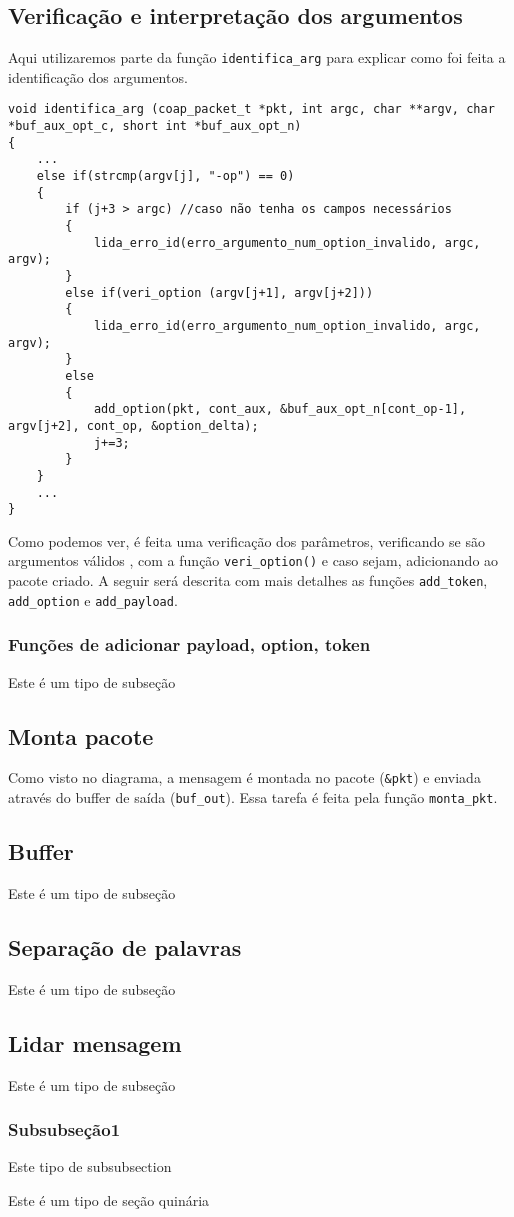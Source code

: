 \subsection{Verificação e interpretação dos argumentos}

Aqui utilizaremos parte da função \texttt{identifica\_arg} para explicar como foi feita a identificação dos argumentos.
\begin{lstlisting}
void identifica_arg (coap_packet_t *pkt, int argc, char **argv, char *buf_aux_opt_c, short int *buf_aux_opt_n)
{
	...
	else if(strcmp(argv[j], "-op") == 0)
	{
		if (j+3 > argc) //caso não tenha os campos necessários
		{
			lida_erro_id(erro_argumento_num_option_invalido, argc, argv);
		}
		else if(veri_option (argv[j+1], argv[j+2]))
		{
			lida_erro_id(erro_argumento_num_option_invalido, argc, argv);
		}
		else
		{
			add_option(pkt, cont_aux, &buf_aux_opt_n[cont_op-1], argv[j+2], cont_op, &option_delta);
			j+=3;
		}
	}
	...
}
\end{lstlisting}

Como podemos ver, é feita uma verificação dos parâmetros, verificando se são argumentos válidos , com a função \texttt{veri\_option()} e caso sejam, adicionando ao pacote criado. A seguir será descrita com mais detalhes as funções \texttt{add_token}, \texttt{add_option} e \texttt{add_payload}. 

\subsubsection{Funções de adicionar payload, option, token}
Este é um tipo de subseção

\subsection{Monta pacote}
Como visto no diagrama, a mensagem é montada no pacote (\texttt{&pkt}) e enviada através do buffer de saída (\texttt{buf_out}). Essa tarefa é feita pela função \texttt{monta_pkt}.




\subsection{Buffer}
Este é um tipo de subseção

\subsection{Separação de palavras}
Este é um tipo de subseção

\subsection{Lidar mensagem}
Este é um tipo de subseção

\subsubsection{Subsubseção1}
Este tipo de subsubsection

Este é um tipo de seção quinária

